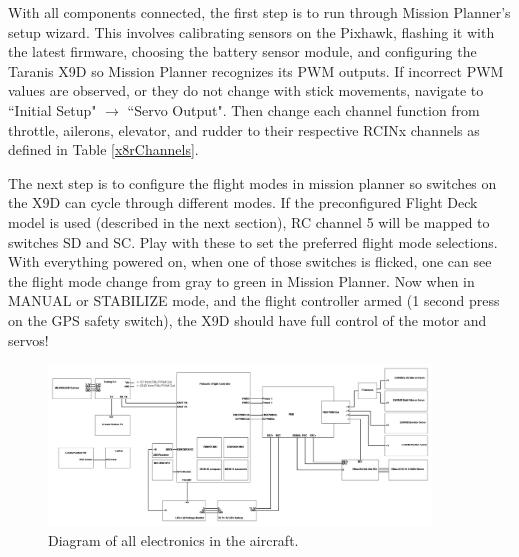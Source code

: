 \documentclass[12pt,journal,compsoc]{IEEEtran}
\begin{document}
With all components connected, the first step is to run through Mission Planner's setup wizard. This involves calibrating sensors on the Pixhawk, flashing it with the latest firmware, choosing the battery sensor module, and configuring the Taranis X9D so Mission Planner recognizes its PWM outputs. If incorrect PWM values are observed, or they do not change with stick movements, navigate to ``Initial Setup" $\rightarrow$ ``Servo Output". Then change each channel function from throttle, ailerons, elevator, and rudder to their respective RCINx channels as defined in Table \ref{x8rChannels}.

The next step is to configure the flight modes in mission planner so switches on the X9D can cycle through different modes. If the preconfigured Flight Deck model is used (described in the next section), RC channel 5 will be mapped to switches SD and SC. Play with these to set the preferred flight mode selections. With everything powered on, when one of those switches is flicked, one can see the flight mode change from gray to green in Mission Planner. Now when in MANUAL or STABILIZE mode, and the flight controller armed (1 second press on the GPS safety switch), the X9D should have full control of the motor and servos!

\begin{figure}[h!]
\hspace*{0cm}
\centering
\includegraphics[width=4in]{hardwareBlockDiagram.png}
\caption{Diagram of all electronics in the aircraft.}
\label{mainScheme}
\end{figure}
\end{document}

